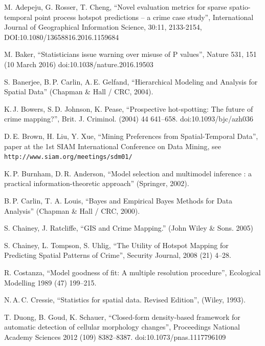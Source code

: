 \documentclass[twoside,a4paper,twocolumn,10pt]{article}
\theoremstyle{plain}
\theoremstyle{definition}
\begin{document}
\begin{thebibliography}{99}

 M. Adepeju, G. Rosser, T. Cheng,
	``Novel evaluation metrics for sparse spatio-temporal point process hotspot predictions -- a crime case study'', International Journal of Geographical Information Science, 30:11, 2133-2154, DOI:10.1080/13658816.2016.1159684

 M. Baker,
        ``Statisticians issue warning over misuse of P values'',
        Nature 531, 151 (10 March 2016) doi:10.1038/nature.2016.19503

 S. Banerjee, B.\,P. Carlin, A.\,E. Gelfand,
        ``Hierarchical Modeling and Analysis for Spatial Data''
        (Chapman \& Hall / CRC, 2004).

 K.\,J. Bowers, S.\,D. Johnson, K. Pease,
	``Prospective hot-spotting: The future of crime mapping?'', 
	Brit. J. Criminol. (2004) 44 641--658. doi:10.1093/bjc/azh036

 D.\,E. Brown, H. Liu, Y. Xue,
	``Mining Preferences from Spatial-Temporal Data'',
	paper at the 1st SIAM International Conference on Data Mining, see
	\texttt{http://www.siam.org/meetings/sdm01/}

 K.\,P. Burnham, D.\,R. Anderson,
	``Model selection and multimodel inference : a practical information-theoretic approach''
	(Springer, 2002).

 B.\,P. Carlin, T. A. Louis,
        ``Bayes and Empirical Bayes Methods for Data Analysis''
        (Chapman \& Hall / CRC, 2000).

 S. Chainey, J. Ratcliffe, ``GIS and Crime Mapping.''
	(John Wiley \& Sons. 2005)
	
 S. Chainey, L. Tompson, S. Uhlig,
	``The Utility of Hotspot Mapping for Predicting Spatial Patterns of Crime'',
	Security Journal, 2008 (21) 4--28.

 R. Costanza, ``Model goodness of fit: A multiple resolution procedure'',
	Ecological Modelling 1989 (47) 199--215.

 N.\,A.\,C. Cressie, ``Statistics for spatial data.  Revised Edition'',
    (Wiley, 1993).

 T. Duong, B. Goud, K. Schauer,
	``Closed-form density-based framework for automatic detection of cellular morphology changes'',
	Proceedings National Academy Sciences 2012 (109) 8382--8387.
	doi:10.1073/pnas.1117796109


\end{thebibliography}
\end{document}
